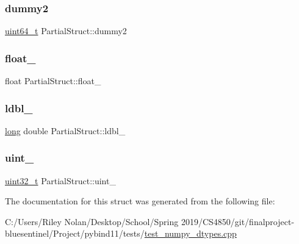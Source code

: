 \subsubsection{\texorpdfstring{dummy2}{dummy2}}
{\footnotesize\ttfamily \mbox{\hyperlink{_s_d_l__config_8h_aaa5d1cd013383c889537491c3cfd9aad}{uint64\+\_\+t}} Partial\+Struct\+::dummy2}

\mbox{\label{struct_partial_struct_aa8c12e2641a168436ae5fe5252fac932}} 
\subsubsection{\texorpdfstring{float\_}{float\_}}
{\footnotesize\ttfamily float Partial\+Struct\+::float\+\_\+}

\mbox{\label{struct_partial_struct_ac4484296d436d98225a7f7c3d9ce4f27}} 
\subsubsection{\texorpdfstring{ldbl\_}{ldbl\_}}
{\footnotesize\ttfamily \mbox{\hyperlink{modsupport_8h_a0cb68e00fb9fb1260ee2daadd9fe6611}{long}} double Partial\+Struct\+::ldbl\+\_\+}

\mbox{\label{struct_partial_struct_a08db7a5396c67e8a721c3b06ce6e97b9}} 
\subsubsection{\texorpdfstring{uint\_}{uint\_}}
{\footnotesize\ttfamily \mbox{\hyperlink{_s_d_l__config_8h_a435d1572bf3f880d55459d9805097f62}{uint32\+\_\+t}} Partial\+Struct\+::uint\+\_\+}



The documentation for this struct was generated from the following file\+:\begin{DoxyCompactItemize}
\item 
C\+:/\+Users/\+Riley Nolan/\+Desktop/\+School/\+Spring 2019/\+C\+S4850/git/finalproject-\/bluesentinel/\+Project/pybind11/tests/\mbox{\hyperlink{test__numpy__dtypes_8cpp}{test\+\_\+numpy\+\_\+dtypes.\+cpp}}\end{DoxyCompactItemize}
